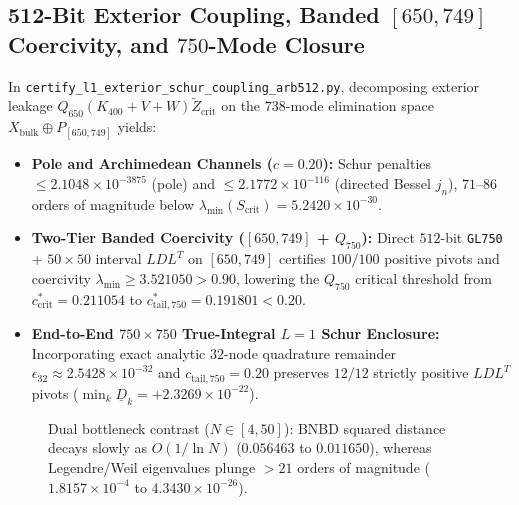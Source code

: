 \documentclass[11pt,a4paper]{article}
\theoremstyle{definition}
\begin{document}
\subsection{512-Bit Exterior Coupling, Banded $[650, 749]$ Coercivity, and $750$-Mode Closure}
In \texttt{certify\_\allowbreak l1\_\allowbreak exterior\_\allowbreak schur\_\allowbreak coupling\_\allowbreak arb512.py}, decomposing exterior leakage $Q_{650}(K_{400} + V + W)\widetilde{Z}_{\mathrm{crit}}$ on the $738$-mode elimination space $X_{\mathrm{bulk}} \oplus P_{[650, 749]}$ yields:
\begin{itemize}[noitemsep]
  \item \textbf{Pole and Archimedean Channels ($c = 0.20$):} Schur penalties $\le 2.1048 \times 10^{-3875}$ (pole) and $\le 2.1772 \times 10^{-116}$ (directed Bessel $j_n$), $71$--$86$ orders of magnitude below $\lambda_{\min}(S_{\mathrm{crit}}) = 5.2420 \times 10^{-30}$.
  \item \textbf{Two-Tier Banded Coercivity ($[650, 749]$ + $Q_{750}$):} Direct $512$-bit \texttt{GL750} + $50 \times 50$ interval $LDL^T$ on $[650, 749]$ certifies $100/100$ positive pivots and coercivity $\lambda_{\min} \ge 3.521050 > 0.90$, lowering the $Q_{750}$ critical threshold from $c_{\mathrm{crit}}^* = 0.211054$ to $c_{\mathrm{tail},750}^* = 0.191801 < 0.20$.
  \item \textbf{End-to-End $750 \times 750$ True-Integral $L = 1$ Schur Enclosure:} Incorporating exact analytic $32$-node quadrature remainder $\epsilon_{32} \approx 2.5428 \times 10^{-32}$ and $c_{\mathrm{tail},750} = 0.20$ preserves $12/12$ strictly positive $LDL^T$ pivots ($\min_k \underline{D}_k = +2.3269 \times 10^{-22}$).
\end{itemize}

\begin{figure}[htbp]
\centering
{}
\caption{Dual bottleneck contrast ($N \in [4, 50]$): BNBD squared distance decays slowly as $O(1/\ln N)$ ($0.056463$ to $0.011650$), whereas Legendre/Weil eigenvalues plunge $>21$ orders of magnitude ($1.8157 \times 10^{-4}$ to $4.3430 \times 10^{-26}$).}
\label{fig:dual_bottleneck}
\end{figure}
\end{document}
